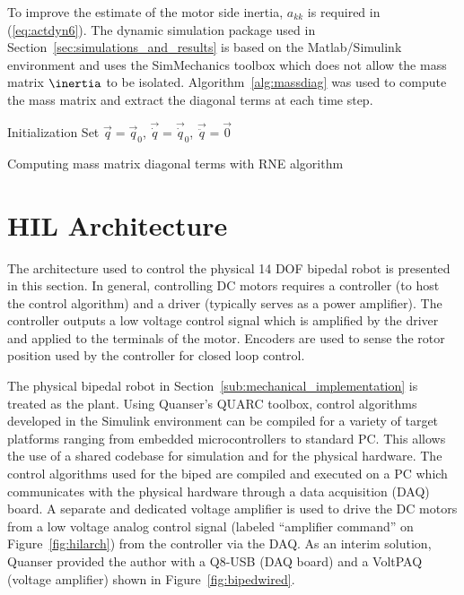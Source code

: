 To improve the estimate of the motor side inertia, $a_{kk}$ is required in (\ref{eq:actdyn6}). The dynamic simulation package used in Section~\ref{sec:simulations_and_results} is based on the Matlab/Simulink environment and uses the SimMechanics toolbox which does not allow the mass matrix $\inertia$ to be isolated. Algorithm~\ref{alg:massdiag} was used to compute the mass matrix and extract the diagonal terms at each time step. \\

\begin{algorithm}[H]
 \SetAlgoLined
 Initialization\;
 Set $\vec{q} = \vec{q}_0$, $\vec{\dot q} = \vec{\dot q}_0$, $\vec{\ddot q} = \vec{0}$\;
 \caption{Computing mass matrix diagonal terms with RNE algorithm}
 \label{alg:massdiag}
\end{algorithm}


\section{HIL Architecture} %
\label{sec:hil_architecture}
The architecture used to control the physical 14 DOF bipedal robot is presented in this section. In general, controlling DC motors requires a controller (to host the control algorithm) and a driver (typically serves as a power amplifier). The controller outputs a low voltage control signal which is amplified by the driver and applied to the terminals of the motor. Encoders are used to sense the rotor position used by the controller for closed loop control. 

The physical bipedal robot in Section~\ref{sub:mechanical_implementation} is treated as the plant. Using Quanser's QUARC toolbox, control algorithms developed in the Simulink environment can be compiled for a variety of target platforms ranging from embedded microcontrollers to standard PC. This allows the use of a shared codebase for simulation and for the physical hardware. The control algorithms used for the biped are compiled and executed on a PC which communicates with the physical hardware through a data acquisition (DAQ) board. A separate and dedicated voltage amplifier is used to drive the DC motors from a low voltage analog control signal (labeled ``amplifier command'' on Figure~\ref{fig:hilarch}) from the controller via the DAQ. As an interim solution, Quanser provided the author with a Q8-USB (DAQ board) and a VoltPAQ (voltage amplifier) shown in Figure~\ref{fig:bipedwired}.

